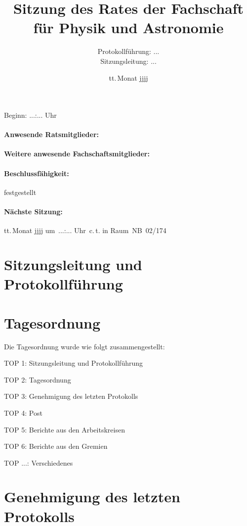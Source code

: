 \documentclass[a4paper,12pt]{article}
\title{Sitzung des Rates der Fachschaft\\für Physik und Astronomie}
\begin{document}
\date{tt.\,Monat jjjj}
\author{Protokollführung: ...\\Sitzungsleitung: ...}

\maketitle
\begin{center}
{Beginn: ...:... Uhr}
\end{center}
\paragraph{Anwesende Ratsmitglieder:}{}
\paragraph{Weitere anwesende Fachschaftsmitglieder:}{}
\paragraph{Beschlussfähigkeit:}{festgestellt}
\paragraph{Nächste Sitzung:}{tt.\,Monat jjjj um~...:... Uhr~c.\,t. in Raum~NB~02/174}

\newpage

\section{Sitzungsleitung und Protokollführung}

\section{Tagesordnung}
Die Tagesordnung wurde wie folgt zusammengestellt:

TOP 1: Sitzungsleitung und Protokollführung

TOP 2: Tagesordnung

TOP 3: Genehmigung des letzten Protokolls

TOP 4: Post

TOP 5: Berichte aus den Arbeitskreisen

TOP 6: Berichte aus den Gremien

TOP ...: Verschiedenes

\section{Genehmigung des letzten Protokolls}
\end{document}
